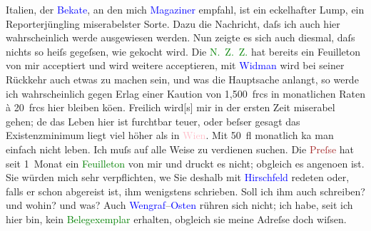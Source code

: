                     Italien, der \textcolor{blue}{Beka{\geminationn}te}{}, an den mich \textcolor{blue}{Magaziner}{}\ledrightnote{\textcolor{blue}{Viktor Adalbert Magaziner}} empfahl, ist ein eckelhafter Lump, ein
                    Reporterjüngling miserabelster Sorte. Dazu die Nachricht, daſs ich auch hier
                    wahrscheinlich werde ausgewiesen werden. Nun zeigte es sich auch diesmal, daſs
                    nichts so heiſs gegeſsen, wie gekocht wird. Die \textcolor{green}{N. Z. Z.}{}\ledrightnote{\textcolor{green}{Neue Zürcher Zeitung}} hat bereits ein Feuilleton von mir acceptiert und wird
                    weitere acceptieren, mit \textcolor{blue}{Widman}{}\ledrightnote{\textcolor{blue}{Joseph Victor Widmann}} wird bei
                    seiner Rückkehr auch etwas zu machen sein, und was die Hauptsache anlangt, so
                    werde ich wahrscheinlich gegen Erlag einer Kaution von 1,500 frcs in monatlichen
                    Raten à 20 frcs hier bleiben kö{\geminationn}en. Freilich
                    wird{[}s{]} mir in {\pb}der ersten Zeit miserabel gehen; de{\geminationn} das Leben
                    hier ist furchtbar teuer, oder beſser gesagt das Existenzminimum liegt viel
                    höher als in \textcolor{pink}{Wien}{}\ledrightnote{\textcolor{pink}{Wien}}. Mit 50 fl monatlich ka{\geminationn} man einfach nicht leben. Ich muſs auf alle Weise
                    zu verdienen suchen. Die \textcolor{brown}{Preſse}{}\ledrightnote{\textcolor{brown}{Die Presse}} hat seit
                    1 Monat ein \textcolor{green}{Feuilleton}{} von
                    mir und druckt es nicht; obgleich es angeno{\geminationm}en ist.
                    Sie würden mich sehr verpflichten, we{\geminationn} Sie deshalb
                    mit \textcolor{blue}{Hirschfeld}{}\ledrightnote{\textcolor{blue}{Robert Hirschfeld}} redeten oder, falls er schon
                    abgereist ist, ihm wenigstens schrieben. Soll ich ihm auch schreiben? und wohin?
                    und was? Auch \textcolor{blue}{Wengraf}{}\ledrightnote{\textcolor{blue}{Edmund Wengraf}}–\textcolor{blue}{Osten}{}\ledrightnote{\textcolor{blue}{Heinrich Osten}} rühren sich nicht; ich habe, seit ich hier bin,
                    kein \textcolor{green}{\textcolor{green}{Belegexemplar}{}}{} erhalten, obgleich sie meine Adreſse doch wiſsen.\pend
